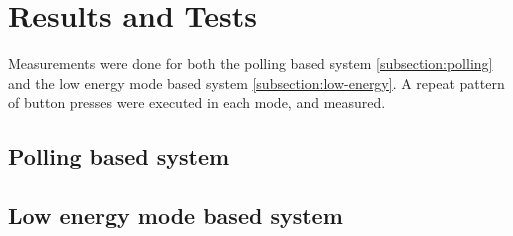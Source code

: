 \section{Results and Tests}

Measurements were done for both the polling based system \ref{subsection:polling} and the low energy mode based system \ref{subsection:low-energy}. A repeat pattern of button presses were executed in each mode, and measured.

\subsection{Polling based system}

\subsection{Low energy mode based system}
